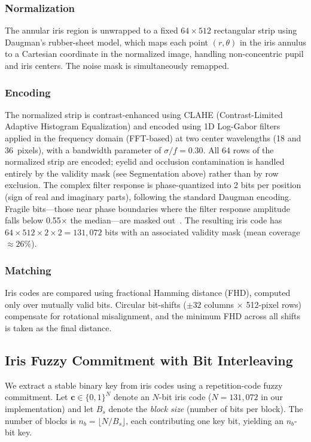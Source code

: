 \documentclass[conference]{IEEEtran}
\begin{document}
\subsubsection{Normalization}
The annular iris region is unwrapped to a fixed $64 \times 512$ rectangular strip using Daugman's rubber-sheet model, which maps each point $(r, \theta)$ in the iris annulus to a Cartesian coordinate in the normalized image, handling non-concentric pupil and iris centers. The noise mask is simultaneously remapped.

\subsubsection{Encoding}
The normalized strip is contrast-enhanced using CLAHE (Contrast-Limited Adaptive Histogram Equalization) and encoded using 1D Log-Gabor filters applied in the frequency domain (FFT-based) at two center wavelengths (18 and 36~pixels), with a bandwidth parameter of $\sigma/f = 0.30$. All 64 rows of the normalized strip are encoded; eyelid and occlusion contamination is handled entirely by the validity mask (see Segmentation above) rather than by row exclusion. The complex filter response is phase-quantized into 2 bits per position (sign of real and imaginary parts), following the standard Daugman encoding. Fragile bits---those near phase boundaries where the filter response amplitude falls below 0.55$\times$ the median---are masked out~\cite{hollingsworth2009fragile}. The resulting iris code has $64 \times 512 \times 2 \times 2 = 131{,}072$ bits with an associated validity mask (mean coverage $\approx 26\%$).

\subsubsection{Matching}
Iris codes are compared using fractional Hamming distance (FHD), computed only over mutually valid bits. Circular bit-shifts ($\pm 32$ columns $\times$ 512-pixel rows) compensate for rotational misalignment, and the minimum FHD across all shifts is taken as the final distance. 

\subsection{Iris Fuzzy Commitment with Bit Interleaving}
\label{sec:iris_commitment}

We extract a stable binary key from iris codes using a repetition-code fuzzy commitment. Let $\mathbf{c} \in \{0,1\}^{N}$ denote an $N$-bit iris code ($N = 131{,}072$ in our implementation) and let $B_s$ denote the \emph{block size} (number of bits per block). The number of blocks is $n_b = \lfloor N / B_s \rfloor$, each contributing one key bit, yielding an $n_b$-bit key.
\end{document}
